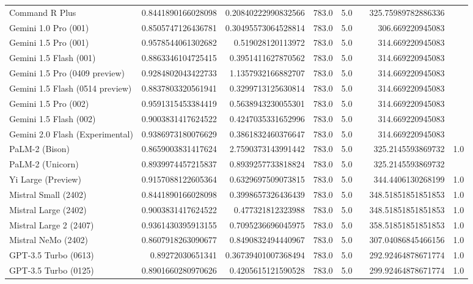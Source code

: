 \begin{table}[htp]
{\begin{tabular}{lrrrrrrr}
Command R Plus & 0.8441890166028098 & 0.20840222990832566 & 783.0 & 5.0 &  & 325.75989782886336 &  \\
Gemini 1.0 Pro (001) & 0.8505747126436781 & 0.30495573064528814 & 783.0 & 5.0 &  & 306.669220945083 &  \\
Gemini 1.5 Pro (001) & 0.9578544061302682 & 0.519028120113972 & 783.0 & 5.0 &  & 314.669220945083 &  \\
Gemini 1.5 Flash (001) & 0.8863346104725415 & 0.3951411627870562 & 783.0 & 5.0 &  & 314.669220945083 &  \\
Gemini 1.5 Pro (0409 preview) & 0.9284802043422733 & 1.1357932166882707 & 783.0 & 5.0 &  & 314.669220945083 &  \\
Gemini 1.5 Flash (0514 preview) & 0.8837803320561941 & 0.3299713125630814 & 783.0 & 5.0 &  & 314.669220945083 &  \\
Gemini 1.5 Pro (002) & 0.9591315453384419 & 0.5638943230055301 & 783.0 & 5.0 &  & 314.669220945083 &  \\
Gemini 1.5 Flash (002) & 0.9003831417624522 & 0.4247035331652996 & 783.0 & 5.0 &  & 314.669220945083 &  \\
Gemini 2.0 Flash (Experimental) & 0.9386973180076629 & 0.3861832460376647 & 783.0 & 5.0 &  & 314.669220945083 &  \\
PaLM-2 (Bison) & 0.8659003831417624 & 2.7590373143991442 & 783.0 & 5.0 &  & 325.2145593869732 & 1.0 \\
PaLM-2 (Unicorn) & 0.8939974457215837 & 0.8939257733818824 & 783.0 & 5.0 &  & 325.2145593869732 &  \\
Yi Large (Preview) & 0.9157088122605364 & 0.6329697509073815 & 783.0 & 5.0 &  & 344.4406130268199 & 1.0 \\
Mistral Small (2402) & 0.8441890166028098 & 0.3998657326436439 & 783.0 & 5.0 &  & 348.51851851851853 & 1.0 \\
Mistral Large (2402) & 0.9003831417624522 & 0.477321812323988 & 783.0 & 5.0 &  & 348.51851851851853 & 1.0 \\
Mistral Large 2 (2407) & 0.9361430395913155 & 0.7095236696045975 & 783.0 & 5.0 &  & 358.51851851851853 & 1.0 \\
Mistral NeMo (2402) & 0.8607918263090677 & 0.8490832494440967 & 783.0 & 5.0 &  & 307.04086845466156 & 1.0 \\
GPT-3.5 Turbo (0613) & 0.89272030651341 & 0.36739401007368494 & 783.0 & 5.0 &  & 292.92464878671774 & 1.0 \\
GPT-3.5 Turbo (0125) & 0.8901660280970626 & 0.4205615121590528 & 783.0 & 5.0 &  & 299.92464878671774 & 1.0 \\

\end{tabular}}
\end{table}
